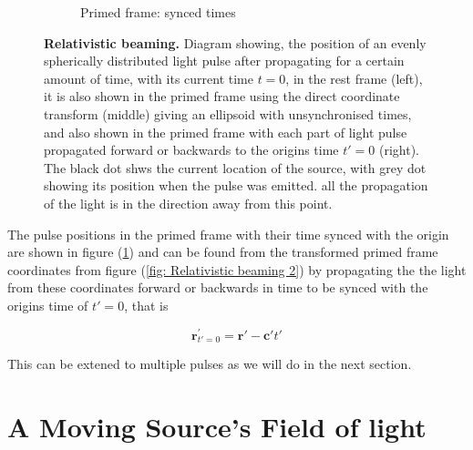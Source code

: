 \begin{figure}[H]
\begin{subfigure}{.32\textwidth}
		\caption{Primed frame: synced times}
		\label{fig: Relativistic beaming 3}
	\end{subfigure}
	\caption{\textbf{Relativistic beaming.} Diagram showing, the position of an evenly spherically distributed light pulse after propagating for a certain amount of time, with its current time ${t}=0$, in the rest frame (left), it is also shown in the primed frame using the direct coordinate transform (middle) giving an ellipsoid with unsynchronised times, and also shown in the primed frame with each part of light pulse propagated forward or backwards to the origins time $t{'}=0$ (right). The black dot shws the current location of the source, with grey dot showing its position when the pulse was emitted. all the propagation of the light is in the direction away from this point.}
	\label{fig Relativistic beaming}
\end{figure}

The pulse positions in the primed frame with their time synced with the origin are shown in figure (\ref{fig: Relativistic beaming 3}) and can be found from the transformed primed frame coordinates from figure (\ref{fig: Relativistic beaming 2}) by propagating the the light from these coordinates forward or backwards in time to be synced with the origins time of $t{'}=0$, that is

\begin{equation}
	\mathbf{r}^{'}_{t{'}=0} = \mathbf{r}{'} - \mathbf{c}{'} t{'}
\end{equation}

This can be extened to multiple pulses as we will do in the next section.



\section{A Moving Source's Field of light} \label{ch: A Moving Source's Field}

